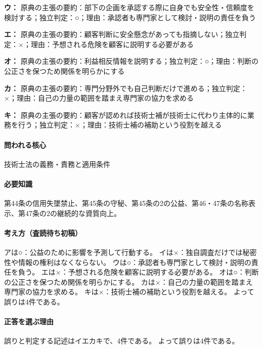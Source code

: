 \noindent\textbf{ウ：} 原典の主張の要約：部下の企画を承認する際に自身でも安全性・信頼度を検討する；独立判定：○；理由：承認者も専門家として検討・説明の責任を負う\par

\noindent\textbf{エ：} 原典の主張の要約：顧客判断に安全懸念があっても指摘しない；独立判定：×；理由：予想される危険を顧客に説明する必要がある\par

\noindent\textbf{オ：} 原典の主張の要約：利益相反情報を説明する；独立判定：○；理由：判断の公正さを保つため関係を明らかにする\par

\noindent\textbf{カ：} 原典の主張の要約：専門分野外でも自己判断だけで進める；独立判定：×；理由：自己の力量の範囲を踏まえ専門家の協力を求める\par

\noindent\textbf{キ：} 原典の主張の要約：顧客が認めれば技術士補が技術士に代わり主体的に業務を行う；独立判定：×；理由：技術士補の補助という役割を越える\par

\paragraph{問われる核心} 技術士法の義務・責務と適用条件

\paragraph{必要知識} 第44条の信用失墜禁止、第45条の守秘、第45条の2の公益、第46・47条の名称表示、第47条の2の継続的な資質向上。

\paragraph{考え方（査読待ち初稿）} アは○：公益のために影響を予測して行動する。 イは×：独自調査だけでは秘密性や情報の権利はなくならない。 ウは○：承認者も専門家として検討・説明の責任を負う。 エは×：予想される危険を顧客に説明する必要がある。 オは○：判断の公正さを保つため関係を明らかにする。 カは×：自己の力量の範囲を踏まえ専門家の協力を求める。 キは×：技術士補の補助という役割を越える。 よって誤りは4件である。

\paragraph{正答を選ぶ理由} 誤りと判定する記述はイエカキで、4件である。  よって誤りは4件である。

